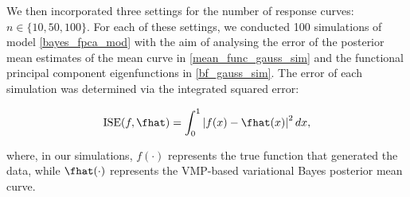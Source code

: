 \documentclass[12pt]{article}
\theoremstyle{plain}
\theoremstyle{definition}
\theoremstyle{remark}
\begin{document}
We then incorporated three settings for the number of response curves: $n \in \{ 10, 50, 100 \}$. For each of these
settings, we conducted 100 simulations of model \eqref{bayes_fpca_mod} with the aim of analysing the error of
the posterior mean estimates of the mean curve in \eqref{mean_func_gauss_sim} and the functional principal
component eigenfunctions in \eqref{bf_gauss_sim}. The error of each simulation was determined via the
integrated squared error:

\begin{equation}
	\text{ISE} (f, \fhat) = \int_0^1 \left| f (x) - \fhat(x) \right|^2 dx,
\label{ise}
\end{equation}

\noindent where, in our simulations, $f (\cdot)$ represents the true function that generated the data, while $\fhat (\cdot)$
represents the VMP-based variational Bayes posterior mean curve.
\end{document}
